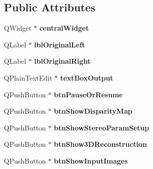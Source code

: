 \subsection*{Public Attributes}
\begin{DoxyCompactItemize}
\item 
Q\+Widget $\ast$ {\bfseries central\+Widget}\hypertarget{class_ui___main_window_a30075506c2116c3ed4ff25e07ae75f81}{}\label{class_ui___main_window_a30075506c2116c3ed4ff25e07ae75f81}

\item 
Q\+Label $\ast$ {\bfseries lbl\+Original\+Left}\hypertarget{class_ui___main_window_a5337796623df84ca8de4d3664294f35e}{}\label{class_ui___main_window_a5337796623df84ca8de4d3664294f35e}

\item 
Q\+Label $\ast$ {\bfseries lbl\+Original\+Right}\hypertarget{class_ui___main_window_a189d3a7b1c5a9d2142cc56a4127ba57d}{}\label{class_ui___main_window_a189d3a7b1c5a9d2142cc56a4127ba57d}

\item 
Q\+Plain\+Text\+Edit $\ast$ {\bfseries text\+Box\+Output}\hypertarget{class_ui___main_window_a20ac574a2eebbef480a7bde5a46f1bbf}{}\label{class_ui___main_window_a20ac574a2eebbef480a7bde5a46f1bbf}

\item 
Q\+Push\+Button $\ast$ {\bfseries btn\+Pause\+Or\+Resume}\hypertarget{class_ui___main_window_a78f374f2f7411a6220b13d127451d341}{}\label{class_ui___main_window_a78f374f2f7411a6220b13d127451d341}

\item 
Q\+Push\+Button $\ast$ {\bfseries btn\+Show\+Disparity\+Map}\hypertarget{class_ui___main_window_aee6041a8cd86e1c236b7886d01c8a332}{}\label{class_ui___main_window_aee6041a8cd86e1c236b7886d01c8a332}

\item 
Q\+Push\+Button $\ast$ {\bfseries btn\+Show\+Stereo\+Param\+Setup}\hypertarget{class_ui___main_window_abbec93e8a58f0fba9a7e31ece8d83c4c}{}\label{class_ui___main_window_abbec93e8a58f0fba9a7e31ece8d83c4c}

\item 
Q\+Push\+Button $\ast$ {\bfseries btn\+Show3\+D\+Reconstruction}\hypertarget{class_ui___main_window_a59ef5ea36b7ee42a9a65b3c2c85f9e91}{}\label{class_ui___main_window_a59ef5ea36b7ee42a9a65b3c2c85f9e91}

\item 
Q\+Push\+Button $\ast$ {\bfseries btn\+Show\+Input\+Images}\hypertarget{class_ui___main_window_a460acfa3b85a277ff112d34d68b1d9fb}{}\label{class_ui___main_window_a460acfa3b85a277ff112d34d68b1d9fb}


\end{DoxyCompactItemize}
